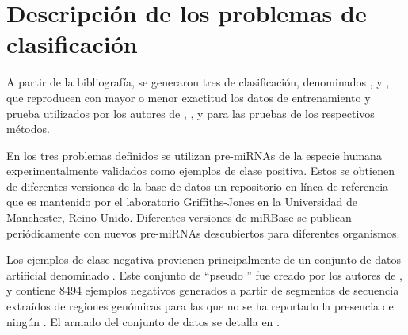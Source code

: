 %
%
%
\section{Descripción de los problemas de clasificación}
%
A partir de la bibliografía, se generaron tres  de
clasificación, denominados ,  y
, que reproducen con mayor o menor exactitud los datos
de entrenamiento y prueba utilizados por los autores de
 \cite{xue},  \cite{ng}, y 
\cite{batuwita} para las pruebas de los respectivos métodos.

En los tres problemas definidos se utilizan pre-miRNAs de la especie
humana experimentalmente validados como ejemplos de clase positiva.
Estos  se obtienen de diferentes versiones de la base de
datos  \cite{mirbase1, mirbase2, mirbase3} un repositorio
en línea de referencia que es mantenido por el laboratorio
Griffiths-Jones en la Universidad de Manchester, Reino Unido.
Diferentes versiones de miRBase se publican periódicamente con nuevos
pre-miRNAs descubiertos para diferentes organismos.

Los ejemplos de clase negativa provienen principalmente de un conjunto
de datos artificial denominado .
Este conjunto de ``pseudo '' fue creado por los autores de
, y contiene 8494 ejemplos negativos generados a partir
de segmentos de secuencia extraídos de regiones genómicas para las que
no se ha reportado la presencia de ningún \premirna{}.
El armado del conjunto de datos  se detalla en
\cite{xue}.
